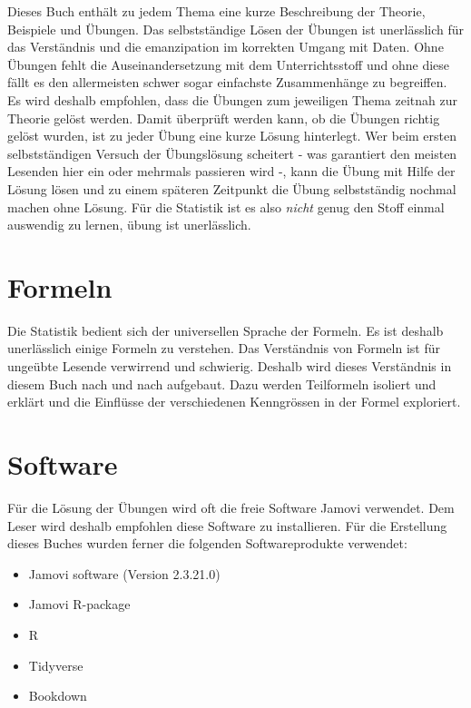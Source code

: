\documentclass[
]{book}
\providecommand{\tightlist}{%
  \setlength{\itemsep}{0pt}\setlength{\parskip}{0pt}}
\theoremstyle{definition}
\theoremstyle{definition}
\theoremstyle{definition}
\theoremstyle{definition}
\theoremstyle{remark}
\begin{document}
Dieses Buch enthält zu jedem Thema eine kurze Beschreibung der Theorie, Beispiele und Übungen. Das selbstständige Lösen der Übungen ist unerlässlich für das Verständnis und die emanzipation im korrekten Umgang mit Daten. Ohne Übungen fehlt die Auseinandersetzung mit dem Unterrichtsstoff und ohne diese fällt es den allermeisten schwer sogar einfachste Zusammenhänge zu begreiffen. Es wird deshalb empfohlen, dass die Übungen zum jeweiligen Thema zeitnah zur Theorie gelöst werden. Damit überprüft werden kann, ob die Übungen richtig gelöst wurden, ist zu jeder Übung eine kurze Lösung hinterlegt. Wer beim ersten selbstständigen Versuch der Übungslösung scheitert - was garantiert den meisten Lesenden hier ein oder mehrmals passieren wird -, kann die Übung mit Hilfe der Lösung lösen und zu einem späteren Zeitpunkt die Übung selbstständig nochmal machen ohne Lösung. Für die Statistik ist es also \emph{nicht} genug den Stoff einmal auswendig zu lernen, übung ist unerlässlich.

\section{Formeln}\label{formeln}

Die Statistik bedient sich der universellen Sprache der Formeln. Es ist deshalb unerlässlich einige Formeln zu verstehen. Das Verständnis von Formeln ist für ungeübte Lesende verwirrend und schwierig. Deshalb wird dieses Verständnis in diesem Buch nach und nach aufgebaut. Dazu werden Teilformeln isoliert und erklärt und die Einflüsse der verschiedenen Kenngrössen in der Formel exploriert.

\section{Software}\label{software}

Für die Lösung der Übungen wird oft die freie Software Jamovi verwendet. Dem Leser wird deshalb empfohlen diese Software zu installieren. Für die Erstellung dieses Buches wurden ferner die folgenden Softwareprodukte verwendet:

\begin{itemize}
\tightlist
\item
  Jamovi software (Version 2.3.21.0)
\item
  Jamovi R-package \citep{R-jmv}
\item
  R \citep{R-base}
\item
  Tidyverse \citep{tidyverse2019}
\item
  Bookdown \citep{bookdown2016}
\end{itemize}
\end{document}
